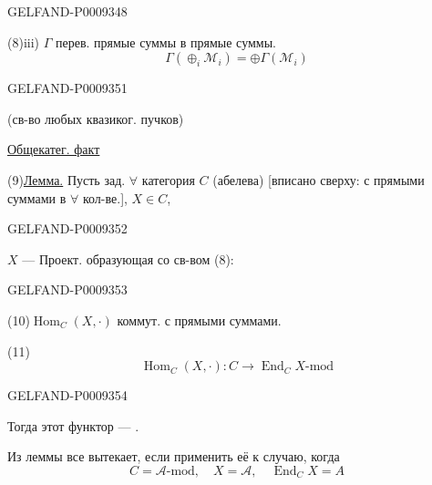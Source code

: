 \begin{GelfandAdjacentEvidence}{GELFAND-P000934}{8}


(8)\quad iii) $\Gamma$ перев. прямые суммы в прямые суммы.
\[
 \Gamma(\oplus_i\mathcal M_i)=\oplus\Gamma(\mathcal M_i)
\]
\end{GelfandAdjacentEvidence}


\begin{GelfandAdjacentEvidence}{GELFAND-P000935}{1}

(св-во любых квазиког. пучков)

\underline{Общекатег. факт}

(9)\quad \underline{Лемма.} Пусть зад. $\forall$ категория $C$ (абелева)
[вписано сверху: с прямыми суммами в $\forall$ кол-ве.], $X\in C$,
\end{GelfandAdjacentEvidence}
\begin{GelfandAdjacentEvidence}{GELFAND-P000935}{2}


$X$ --- Проект. образующая со св-вом (8):
\end{GelfandAdjacentEvidence}
\begin{GelfandAdjacentEvidence}{GELFAND-P000935}{3}


(10)\quad $\operatorname{Hom}_C(X,\cdot)$ коммут. с прямыми суммами.

(11)
\[
 \operatorname{Hom}_C(X,\cdot):C\longrightarrow\operatorname{End}_C X\text{-mod}
\]
\end{GelfandAdjacentEvidence}
\begin{GelfandAdjacentEvidence}{GELFAND-P000935}{4}


Тогда этот функтор --- .

Из леммы все вытекает, если применить её к случаю, когда
\begin{equation*}
 C=\mathcal A\text{-mod},\quad X=\mathcal A,\quad\operatorname{End}_C X=A
 \tag{12}
\end{equation*}
\end{GelfandAdjacentEvidence}
